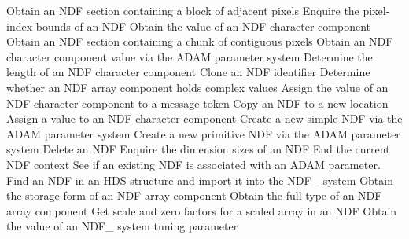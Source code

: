 \begin{latexonly}
            {Obtain an NDF section containing a block of adjacent pixels}
            {Enquire the pixel-index bounds of an NDF}
            {Obtain the value of an NDF character component}
            {Obtain an NDF section containing a chunk of contiguous pixels}
            {Obtain an NDF character component value via the ADAM parameter system}
            {Determine the length of an NDF character component}
            {Clone an NDF identifier}
            {Determine whether an NDF array component holds complex values}
            {Assign the value of an NDF character component to a message token}
            {Copy an NDF to a new location}
            {Assign a value to an NDF character component}
            {Create a new simple NDF via the ADAM parameter system}
            {Create a new primitive NDF via the ADAM parameter system}
            {Delete an NDF}
            {Enquire the dimension sizes of an NDF}
            {End the current NDF context}
            {See if an existing NDF is associated with an ADAM parameter.}
            {Find an NDF in an HDS structure and import it into the NDF\_ system}
            {Obtain the storage form of an NDF array component}
            {Obtain the full type of an NDF array component}
            {Get scale and zero factors for a scaled array in an NDF}
            {Obtain the value of an NDF\_ system tuning parameter}

\end{latexonly}
